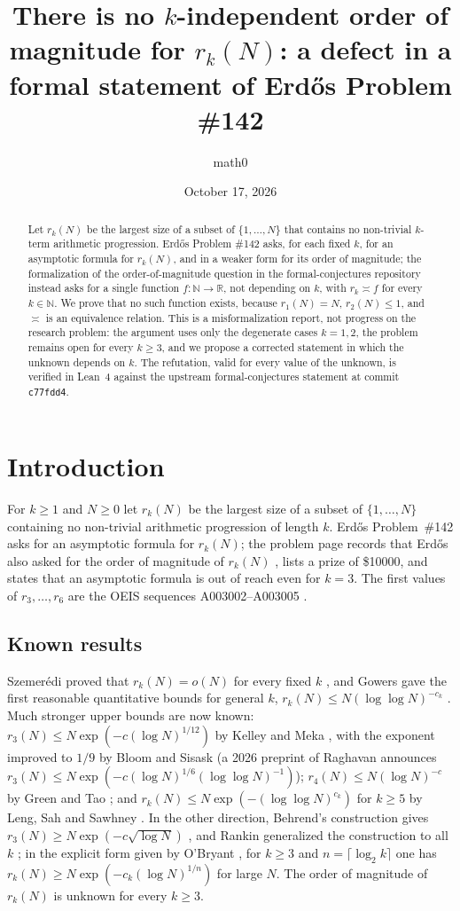 \documentclass[11pt]{amsart}
\title[No $k$-independent order of magnitude for $r_k(N)$]{There is no $k$-independent order of magnitude for $r_k(N)$: a defect in a formal statement of Erd\H{o}s Problem \#142}
\author{math0}
\date{October 17, 2026}
\theoremstyle{plain}
\theoremstyle{definition}
\newcommand{\N}{\mathbb{N}}
\newcommand{\R}{\mathbb{R}}
\begin{document}
\begin{abstract}
Let $r_k(N)$ be the largest size of a subset of $\{1,\dots,N\}$ that contains no non-trivial $k$-term arithmetic progression.
Erd\H{o}s Problem \#142 asks, for each fixed $k$, for an asymptotic formula for $r_k(N)$, and in a weaker form for its order of magnitude; the formalization  of the order-of-magnitude question in the formal-conjectures repository instead asks for a single function $f\colon\N\to\R$, not depending on $k$, with $r_k\asymp f$ for every $k\in\N$.
We prove that no such function exists, because $r_1(N)=N$, $r_2(N)\le1$, and $\asymp$ is an equivalence relation.
This is a misformalization report, not progress on the research problem: the argument uses only the degenerate cases $k=1,2$, the problem remains open for every $k\ge3$, and we propose a corrected statement in which the unknown depends on $k$.
The refutation, valid for every value of the unknown, is verified in Lean~4 against the upstream formal-conjectures statement at commit \texttt{c77fdd4}.
\end{abstract}
\maketitle

\section{Introduction}\label{sec:intro}

For $k\ge1$ and $N\ge0$ let $r_k(N)$ be the largest size of a subset of $\{1,\dots,N\}$ containing no non-trivial arithmetic progression of length $k$.
Erd\H{o}s Problem~\#142 \cite{EP142} asks for an asymptotic formula for $r_k(N)$; the problem page records that Erd\H{o}s also asked for the order of magnitude of $r_k(N)$ \cite{Er80}, lists a prize of \$10000, and states that an asymptotic formula is out of reach even for $k=3$.
The first values of $r_3,\dots,r_6$ are the OEIS sequences A003002--A003005 \cite{OEIS}.

\subsection*{Known results}
Szemer\'edi proved that $r_k(N)=o(N)$ for every fixed $k$ \cite{Sz75}, and Gowers gave the first reasonable quantitative bounds for general $k$, $r_k(N)\le N(\log\log N)^{-c_k}$ \cite{Go01}.
Much stronger upper bounds are now known: $r_3(N)\le N\exp(-c(\log N)^{1/12})$ by Kelley and Meka \cite{KM23}, with the exponent improved to $1/9$ by Bloom and Sisask \cite{BS23} (a 2026 preprint of Raghavan \cite{Rag26} announces $r_3(N)\le N\exp(-c(\log N)^{1/6}(\log\log N)^{-1})$); $r_4(N)\le N(\log N)^{-c}$ by Green and Tao \cite{GT17}; and $r_k(N)\le N\exp(-(\log\log N)^{c_k})$ for $k\ge5$ by Leng, Sah and Sawhney \cite{LSS24}.
In the other direction, Behrend's construction gives $r_3(N)\ge N\exp(-c\sqrt{\log N})$ \cite{Be46}, and Rankin generalized the construction to all $k$ \cite{Ra61}; in the explicit form given by O'Bryant \cite{OB11}, for $k\ge3$ and $n=\lceil\log_2k\rceil$ one has $r_k(N)\ge N\exp(-c_k(\log N)^{1/n})$ for large $N$.
The order of magnitude of $r_k(N)$ is unknown for every $k\ge3$.
\end{document}
